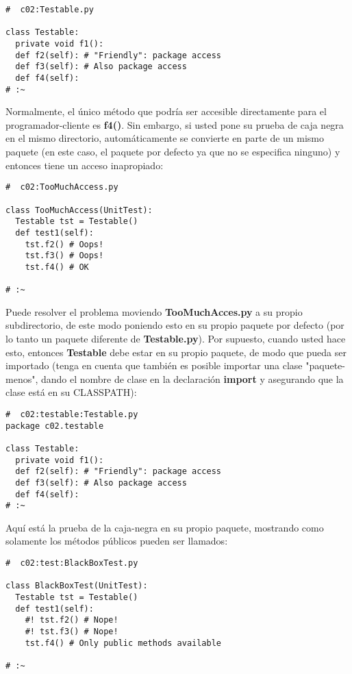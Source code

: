 \begin{lstlisting}
#  c02:Testable.py 

class Testable: 
  private void f1(): 
  def f2(self): # "Friendly": package access 
  def f3(self): # Also package access 
  def f4(self): 
# :~ 
\end{lstlisting}

Normalmente, el único método que podría ser accesible directamente para el programador-cliente es \textbf{f4()}. Sin embargo, si usted pone su prueba de caja negra en el mismo directorio, automáticamente se convierte en parte de un mismo paquete (en este caso, el paquete por defecto ya que no se especifica ninguno) y entonces tiene un acceso inapropiado:  \newline 

\begin{lstlisting}
#  c02:TooMuchAccess.py 

class TooMuchAccess(UnitTest): 
  Testable tst = Testable() 
  def test1(self): 
    tst.f2() # Oops! 
    tst.f3() # Oops! 
    tst.f4() # OK 
    
# :~ 
\end{lstlisting}

Puede resolver el problema moviendo \textbf{TooMuchAcces.py} a su propio subdirectorio, de este modo poniendo esto en su propio paquete por defecto (por lo tanto un paquete diferente de \textbf{Testable.py}). Por supuesto, cuando usted hace esto, entonces \textbf{Testable} debe estar en su propio paquete, de modo que pueda ser importado (tenga en cuenta que también es posible importar una clase "paquete-menos", dando el nombre de clase en la declaración \textbf{import} y asegurando que la clase está en su CLASSPATH):     \newline

\begin{lstlisting}
#  c02:testable:Testable.py 
package c02.testable 

class Testable: 
  private void f1(): 
  def f2(self): # "Friendly": package access 
  def f3(self): # Also package access 
  def f4(self): 
# :~ 
\end{lstlisting}

Aquí está la prueba de la caja-negra en su propio paquete, mostrando como solamente los métodos públicos pueden ser llamados:   \newline  \newline

\begin{lstlisting}
#  c02:test:BlackBoxTest.py 

class BlackBoxTest(UnitTest): 
  Testable tst = Testable() 
  def test1(self): 
    #! tst.f2() # Nope! 
    #! tst.f3() # Nope! 
    tst.f4() # Only public methods available 
    
# :~ 
\end{lstlisting}

